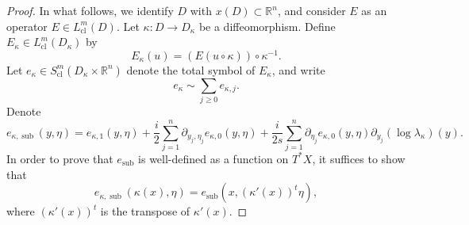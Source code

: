 \documentclass{article}
\newcommand{\RR}{\mathbb R}
\DeclareMathOperator{\sub}{sub}
\DeclareMathOperator{\cl}{cl}
\begin{document}
\begin{proof}
%
In what follows, we identify $D$ with $x(D) \subset \mathbb R^n$, and consider $E$ as an operator $E \in L^m_{\cl}(D)$. Let $\kappa : D \to D_\kappa$ be a diffeomorphism. Define $E_\kappa \in L^m_{\cl}(D_\kappa)$ by $$E_\kappa(u) = \left(E(u \circ \kappa) \right) \circ \kappa^{-1}.$$ Let $e_\kappa \in S^m_{\cl}(D_\kappa\times \RR^n)$ denote the total symbol of $E_\kappa$, and write $$e_\kappa \sim \sum_{j \ge 0} e_{\kappa, j}.$$
%
Denote $$e_{\kappa, \sub}(y, \eta) = e_{\kappa, 1}(y,\eta) + \frac i 2 \sum_{j=1}^n \partial_{y_j, \eta_j} e_{\kappa, 0}(y, \eta) + \frac i {2s}\sum_{j=1}^n \partial_{\eta_j} e_{\kappa,0}(y, \eta) \partial_{y_j}(\log \lambda_\kappa)(y).$$ In order to prove that $e_{\sub}$ is well-defined as a function on $T^*X$, it suffices to show that $$e_{\kappa,\sub}(\kappa(x), \eta) = e_{\sub}(x, (\kappa'(x))^t \eta),$$
where $(\kappa'(x))^t$ is the transpose of $\kappa'(x)$.


\end{proof}
\end{document}
